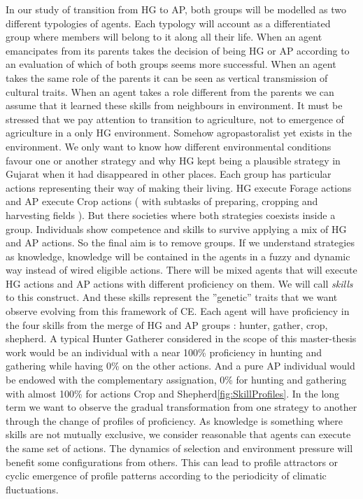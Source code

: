 \documentclass[11pt,oneside,a4paper,openright]{report}
\begin{document}
In our study of transition from HG to AP, both groups will be modelled as two different typologies of agents. Each typology will account as a differentiated group where members will belong to it along all their life. When an agent emancipates from its parents takes the decision of being HG or AP according to an evaluation of which of both groups seems more successful. When an agent takes the same role of the parents it can be seen as vertical transmission of cultural traits. When an agent takes a role different from the parents we can assume that it learned these skills from neighbours in environment. It must be stressed that we pay attention to transition to agriculture, not to emergence of agriculture in a only HG environment. Somehow agropastoralist yet exists in the environment. We only want to know how different environmental conditions favour one or another strategy and why HG kept being a plausible strategy in Gujarat when it had disappeared in other places.
Each group has particular actions representing their way of making their living. HG execute Forage actions and AP execute Crop actions ( with subtasks of preparing, cropping and harvesting fields ). But there societies where both strategies coexists inside a group. Individuals show competence and skills to survive applying a mix of HG and AP actions. So the final aim is to remove groups. If we understand strategies as knowledge, knowledge will be contained in the agents in a fuzzy and dynamic way instead of wired eligible actions. There will be mixed agents that will execute HG actions and AP actions with different proficiency on them. We will call \emph{skills} to this construct. And these skills represent the ''genetic'' traits that we want observe evolving from this framework of CE. Each agent will have proficiency in the four skills from the merge of HG and AP groups : hunter, gather, crop, shepherd. A typical Hunter Gatherer considered in the scope of this master-thesis work would be an individual with a near 100\% proficiency in hunting and gathering while having 0\% on the other actions. And a pure AP individual would be endowed with the complementary assignation, 0\% for hunting and gathering with almost 100\% for actions Crop and Shepherd\ref{fig:SkillProfiles}. In the long term we want to observe the gradual transformation from one strategy to another through the change of profiles of proficiency. As knowledge is something where skills are not mutually exclusive, we consider reasonable that agents can execute the same set of actions. The dynamics of selection and environment pressure will benefit some configurations from others. This can lead to profile attractors or cyclic emergence of profile patterns according to the periodicity of climatic fluctuations.
\end{document}

